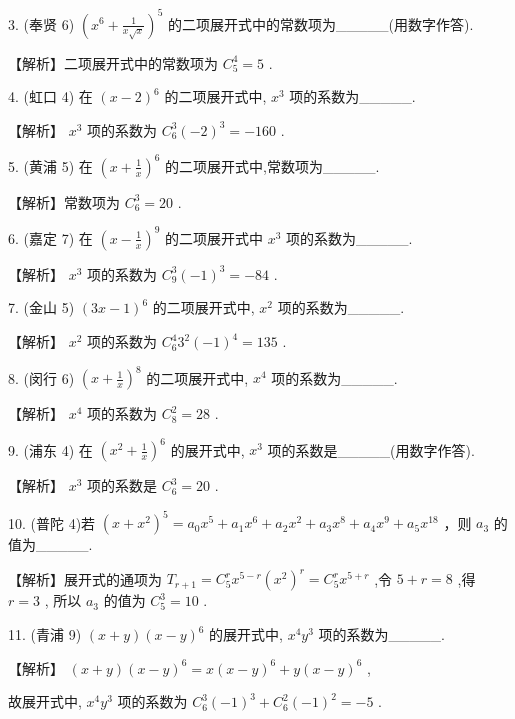 \documentclass[10pt]{article}
\begin{document}
3. (奉贤 6) \({\left( {x}^{6} + \frac{1}{x\sqrt{x}}\right) }^{5}\) 的二项展开式中的常数项为\_\_\_\_\_(用数字作答).

【解析】二项展开式中的常数项为 \({C}_{5}^{4} = 5\) .

4. (虹口 4) 在 \({\left( x - 2\right) }^{6}\) 的二项展开式中, \({x}^{3}\) 项的系数为\_\_\_\_\_.

【解析】 \({x}^{3}\) 项的系数为 \({C}_{6}^{3}{\left( -2\right) }^{3} =  - {160}\) .

5. (黄浦 5) 在 \({\left( x + \frac{1}{x}\right) }^{6}\) 的二项展开式中,常数项为\_\_\_\_\_.

【解析】常数项为 \({C}_{6}^{3} = {20}\) .

6. (嘉定 7) 在 \({\left( x - \frac{1}{x}\right) }^{9}\) 的二项展开式中 \({x}^{3}\) 项的系数为\_\_\_\_\_.

【解析】 \({x}^{3}\) 项的系数为 \({C}_{9}^{3}{\left( -1\right) }^{3} =  - {84}\) .

7. (金山 5) \({\left( 3x - 1\right) }^{6}\) 的二项展开式中, \({x}^{2}\) 项的系数为\_\_\_\_\_.

【解析】 \({x}^{2}\) 项的系数为 \({C}_{6}^{4}{3}^{2}{\left( -1\right) }^{4} = {135}\) .

8. (闵行 6) \({\left( x + \frac{1}{x}\right) }^{8}\) 的二项展开式中, \({x}^{4}\) 项的系数为\_\_\_\_\_.

【解析】 \({x}^{4}\) 项的系数为 \({C}_{8}^{2} = {28}\) .

9. (浦东 4) 在 \({\left( {x}^{2} + \frac{1}{x}\right) }^{6}\) 的展开式中, \({x}^{3}\) 项的系数是\_\_\_\_\_(用数字作答).

【解析】 \({x}^{3}\) 项的系数是 \({C}_{6}^{3} = {20}\) .

10. (普陀 4)若 \({\left( x + {x}^{2}\right) }^{5} = {a}_{0}{x}^{5} + {a}_{1}{x}^{6} + {a}_{2}{x}^{2} + {a}_{3}{x}^{8} + {a}_{4}{x}^{9} + {a}_{5}{x}^{18}\) ，则 \({a}_{3}\) 的值为\_\_\_\_\_.

【解析】展开式的通项为 \({T}_{r + 1} = {C}_{5}^{r}{x}^{5 - r}{\left( {x}^{2}\right) }^{r} = {C}_{5}^{r}{x}^{5 + r}\) ,令 \(5 + r = 8\) ,得 \(r = 3\) , 所以 \({a}_{3}\) 的值为 \({C}_{5}^{3} = {10}\) .

11. (青浦 9) \(\left( {x + y}\right) {\left( x - y\right) }^{6}\) 的展开式中, \({x}^{4}{y}^{3}\) 项的系数为\_\_\_\_\_.

【解析】 \(\left( {x + y}\right) {\left( x - y\right) }^{6} = x{\left( x - y\right) }^{6} + y{\left( x - y\right) }^{6}\) ,

故展开式中, \({x}^{4}{y}^{3}\) 项的系数为 \({C}_{6}^{3}{\left( -1\right) }^{3} + {C}_{6}^{2}{\left( -1\right) }^{2} =  - 5\) .
\end{document}
